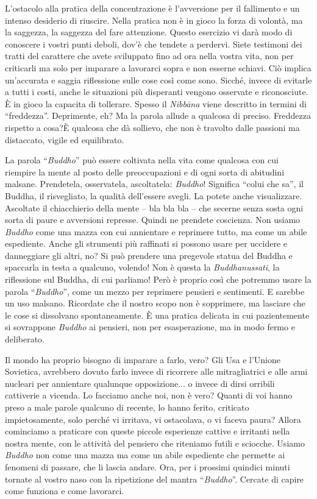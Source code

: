 L'ostacolo alla pratica della concentrazione è l'avversione per il
fallimento e un intenso desiderio di riuscire. Nella pratica non è in
gioco la forza di volontà, ma la saggezza, la saggezza del fare
attenzione. Questo esercizio vi darà modo di conoscere i vostri punti
deboli, dov'è che tendete a perdervi. Siete testimoni dei tratti del
carattere che avete sviluppato fino ad ora nella vostra vita, non per
criticarli ma solo per imparare a lavorarci sopra e non esserne schiavi.
Ciò implica un'accurata e saggia riflessione sulle cose così come sono.
Sicché, invece di evitarle a tutti i costi, anche le situazioni più
disperanti vengono osservate e riconosciute. È in gioco la capacita di
tollerare. Spesso il \textit{Nibbāna} viene descritto in termini di ``freddezza''.
Deprimente, eh? Ma la parola allude a qualcosa di preciso. Freddezza
rispetto a cosa?È qualcosa che dà sollievo, che non è travolto dalle
passioni ma distaccato, vigile ed equilibrato.

La parola ``\textit{Buddho}'' può essere coltivata nella vita come qualcosa con cui
riempire la mente al posto delle preoccupazioni e di ogni sorta di
abitudini malsane. Prendetela, osservatela, ascoltatela: \textit{Buddho}!
Significa ``colui che sa'', il Buddha, il risvegliato, la qualità
dell'essere svegli. La potete anche visualizzare. Ascoltate il
chiacchierio della mente – bla bla bla – che secerne senza sosta ogni
sorta di paure e avversioni represse. Quindi ne prendete coscienza. Non
usiamo \textit{Buddho} come una mazza con cui annientare e reprimere tutto, ma
come un abile espediente. Anche gli strumenti più raffinati si possono
usare per uccidere e danneggiare gli altri, no? Si può prendere una
pregevole statua del Buddha e spaccarla in testa a qualcuno, volendo!
Non è questa la \textit{Buddhanussati}, la riflessione sul Buddha, di cui
parliamo! Però è proprio così che potremmo usare la parola ``\textit{Buddho}'',
come un mezzo per reprimere pensieri e sentimenti. E sarebbe un uso
malsano. Ricordate che il nostro scopo non è sopprimere, ma lasciare che
le cose si dissolvano spontaneamente. È una pratica delicata in cui
pazientemente si sovrappone \textit{Buddho} ai pensieri, non per esasperazione,
ma in modo fermo e deliberato.

Il mondo ha proprio bisogno di imparare a farlo, vero? Gli Usa e
l'Unione Sovietica, avrebbero dovuto farlo invece di ricorrere alle
mitragliatrici e alle armi nucleari per annientare qualunque
opposizione... o invece di dirsi orribili cattiverie a vicenda. Lo
facciamo anche noi, non è vero? Quanti di voi hanno preso a male parole
qualcuno di recente, lo hanno ferito, criticato impietosamente, solo
perché vi irritava, vi ostacolava, o vi faceva paura? Allora cominciamo
a praticare con queste piccole esperienze cattive e irritanti nella
nostra mente, con le attività del pensiero che riteniamo futili e
sciocche. Usiamo \textit{Buddho} non come una mazza ma come un abile espediente
che permette ai fenomeni di passare, che li lascia andare. Ora, per i
prossimi quindici minuti tornate al vostro naso con la ripetizione del
mantra ``\textit{Buddho}''. Cercate di capire come funziona e come lavorarci.

